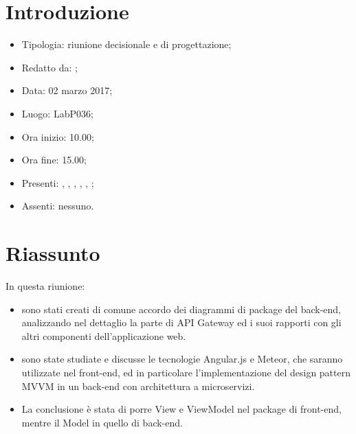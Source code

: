 \section{Introduzione}

	\begin{itemize}
		\item Tipologia: riunione decisionale e di progettazione;
		\item Redatto da: \MC;
		\item Data: 02 marzo 2017;
		\item Luogo: LabP036;
		\item Ora inizio: 10.00;
		\item Ora fine: 15.00;
		\item Presenti: \AN, \AS, \DAN, \DS, \MC, \NS;	
		\item Assenti: nessuno.
	\end{itemize}

\section{Riassunto}
In questa riunione:

\begin{itemize}
	\item sono stati creati di comune accordo dei diagrammi di package del back-end, analizzando nel dettaglio la parte di API Gateway ed i suoi rapporti con gli altri componenti dell'applicazione web.
	\item  sono state studiate e discusse le tecnologie Angular.js e Meteor, che saranno utilizzate nel front-end, ed in particolare l'implementazione del design pattern MVVM in un back-end con architettura a microservizi.
	\item La conclusione è stata di porre View e ViewModel nel package di front-end, mentre il Model in quello di back-end.
\end{itemize}

